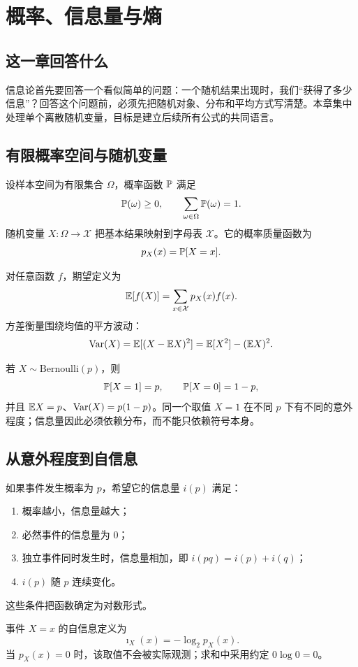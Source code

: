 \chapter{概率、信息量与熵}

\section{这一章回答什么}

信息论首先要回答一个看似简单的问题：一个随机结果出现时，我们“获得了多少信息”？回答这个问题前，必须先把随机对象、分布和平均方式写清楚。本章集中处理单个离散随机变量，目标是建立后续所有公式的共同语言。

\section{有限概率空间与随机变量}

设样本空间为有限集合 $\Omega$，概率函数 $\mathbb{P}$ 满足
\[
\mathbb{P}(\omega)\ge 0,
\qquad
\sum_{\omega\in\Omega}\mathbb{P}(\omega)=1.
\]
随机变量 $X:\Omega\to\mathcal X$ 把基本结果映射到字母表 $\mathcal X$。它的概率质量函数为
\[
p_X(x)=\mathbb{P}[X=x].
\]

对任意函数 $f$，期望定义为
\[
\mathbb{E}[f(X)]=\sum_{x\in\mathcal X}p_X(x)f(x).
\]
方差衡量围绕均值的平方波动：
\[
\operatorname{Var}(X)=\mathbb{E}[(X-\mathbb{E} X)^2]=\mathbb{E}[X^2]-(\mathbb{E} X)^2.
\]

\begin{example}
若 $X\sim\mathrm{Bernoulli}(p)$，则
\[
\mathbb{P}[X=1]=p,\qquad \mathbb{P}[X=0]=1-p,
\]
并且 $\mathbb{E} X=p$、$\operatorname{Var}(X)=p(1-p)$。同一个取值 $X=1$ 在不同 $p$ 下有不同的意外程度；信息量因此必须依赖分布，而不能只依赖符号本身。
\end{example}

\section{从意外程度到自信息}

如果事件发生概率为 $p$，希望它的信息量 $i(p)$ 满足：
\begin{enumerate}
  \item 概率越小，信息量越大；
  \item 必然事件的信息量为 $0$；
  \item 独立事件同时发生时，信息量相加，即 $i(pq)=i(p)+i(q)$；
  \item $i(p)$ 随 $p$ 连续变化。
\end{enumerate}
这些条件把函数确定为对数形式。

\begin{definition}[自信息]
事件 $X=x$ 的自信息定义为
\[
\imath_X(x)=-\log_2 p_X(x).
\]
当 $p_X(x)=0$ 时，该取值不会被实际观测；求和中采用约定 $0\log 0=0$。
\end{definition}

